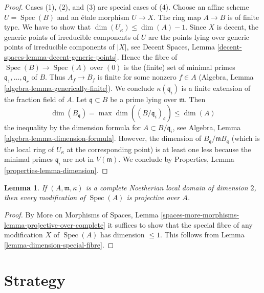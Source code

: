 \documentclass{stacks-project}
\theoremstyle{plain}
\newtheorem{lemma}[subsection]{Lemma}
\theoremstyle{definition}
\theoremstyle{remark}
\numberwithin{equation}{subsection}
\def\Spec{\mathop{\mathrm{Spec}}}
\begin{document}
\begin{proof}
Cases (1), (2), and (3) are special cases of (4). Choose an affine scheme
$U = \Spec(B)$ and an \'etale morphism $U \to X$. The ring map $A \to B$
is of finite type. We have to show that
$\dim(U_\kappa) \leq \dim(A) - 1$. Since $X$ is decent, the generic
points of irreducible components of $U$ are the points lying over
generic points of irreducible components of $|X|$, see
Decent Spaces, Lemma \ref{decent-spaces-lemma-decent-generic-points}.
Hence the fibre of $\Spec(B) \to \Spec(A)$ over $(0)$
is the (finite) set of minimal primes $\mathfrak q_1, \ldots, \mathfrak q_r$
of $B$. Thus $A_f \to B_f$ is finite for some nonzero $f \in A$
(Algebra, Lemma \ref{algebra-lemma-generically-finite}).
We conclude $\kappa(\mathfrak q_i)$ is a finite extension of the
fraction field of $A$.
Let $\mathfrak q \subset B$ be a prime lying over $\mathfrak m$. Then
$$
\dim(B_\mathfrak q) = \max \dim((B/\mathfrak q_i)_{\mathfrak q})
\leq \dim(A)
$$
the inequality by the dimension formula for $A \subset B/\mathfrak q_i$, see
Algebra, Lemma \ref{algebra-lemma-dimension-formula}.
However, the dimension of $B_\mathfrak q/\mathfrak m B_\mathfrak q$
(which is the local ring of $U_\kappa$ at the corresponding point)
is at least one less because the minimal primes $\mathfrak q_i$
are not in $V(\mathfrak m)$. We conclude by
Properties, Lemma \ref{properties-lemma-dimension}.
\end{proof}

\begin{lemma}
\label{lemma-modification-of-dim-2-is-projective-over-complete}
If $(A, \mathfrak m, \kappa)$ is a complete Noetherian local domain
of dimension $2$, then every modification of $\Spec(A)$ is projective over $A$.
\end{lemma}

\begin{proof}
By More on Morphisms of Spaces, Lemma
\ref{spaces-more-morphisms-lemma-projective-over-complete}
it suffices to show that the special fibre of any modification
$X$ of $\Spec(A)$ has dimension $\leq 1$.
This follows from Lemma \ref{lemma-dimension-special-fibre}.
\end{proof}






\section{Strategy}
\label{section-strategy}
\end{document}
